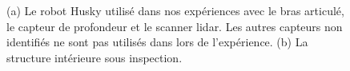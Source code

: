 \begin{figure}[htb]
\centerline{
}
	\centering
    \caption[Équipement utilisé lors des expériences UGV]{
    (a) Le robot Husky utilisé dans nos expériences avec le bras articulé, le capteur de profondeur et le scanner lidar. Les autres capteurs non identifiés ne sont pas utilisés dans lors de l'expérience.
    (b) La structure intérieure sous inspection.}
    \label{fig:husky_exp}
\end{figure}

